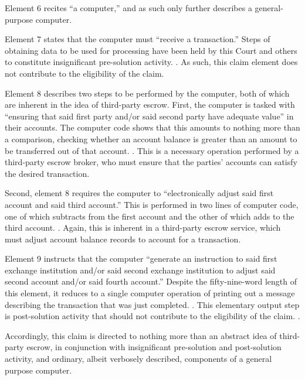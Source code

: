 \documentclass{scotus}
\begin{document}
Element 6 recites ``a computer,'' and as such only further describes a
general-purpose computer.

Element 7 states that the computer must ``receive a transaction.'' Steps of
obtaining data to be used for processing have been held by this Court and others
to constitute insignificant pre-solution activity. . As such, this
claim element does not contribute to the eligibility of the claim.

Element 8 describes two steps to be performed by the computer, both of which are
inherent in the idea of third-party escrow. First, the computer is tasked with
``ensuring that said first party and/or said second party have adequate value''
in their accounts. The computer code shows that this amounts to nothing more
than a comparison, checking whether an account balance is greater than an amount
to be transferred out of that account. . This is a necessary operation performed by a third-party escrow broker, who
must ensure that the parties' accounts can satisfy the desired transaction.

Second, element 8 requires the computer to ``electronically adjust said first
account and said third account.'' This is performed in two lines of computer
code, one of which subtracts from the first account and the other of which adds
to the third account. . Again, this
is inherent in a third-party escrow service, which must adjust account balance
records to account for a transaction.

Element 9 instructs that the computer ``generate an instruction to said first
exchange institution and/or said second exchange institution to adjust said
second account and/or said fourth account.'' Despite the fifty-nine-word length
of this element, it reduces to a single computer operation of printing out a
message describing the transaction that was just completed. . This elementary output step is post-solution activity
that should not contribute to the eligibility of the claim. .

Accordingly, this claim is directed to nothing more than an abstract idea of
third-party escrow, in conjunction with insignificant pre-solution and
post-solution activity, and ordinary, albeit verbosely described, components of
a general purpose computer.
\end{document}
